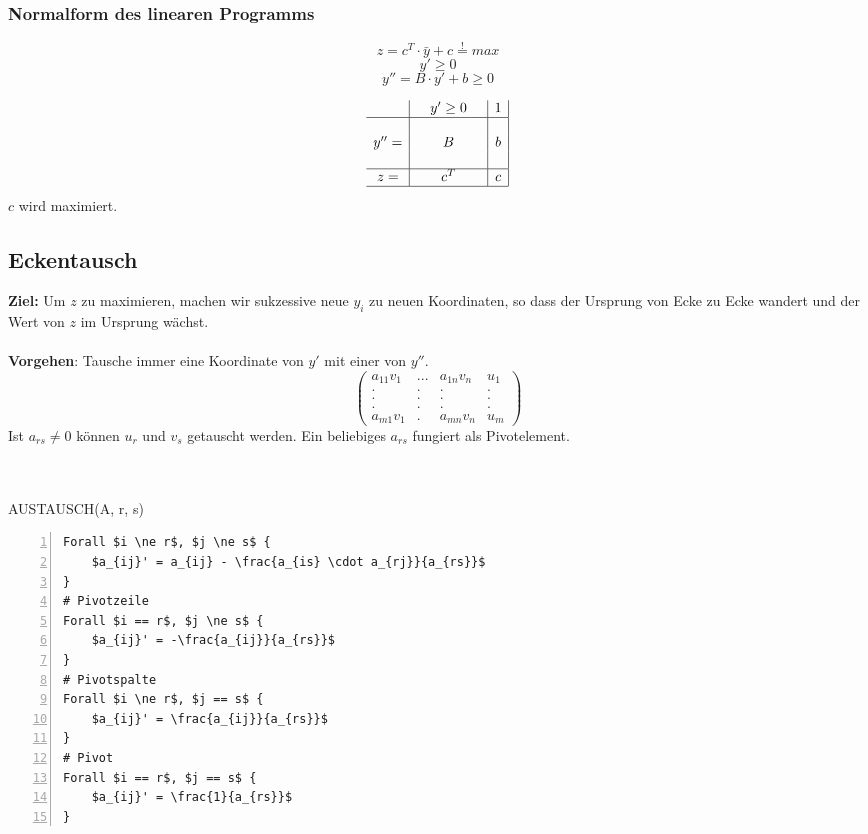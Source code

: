 \subsubsection{Normalform des linearen Programms}
\[z = c^T\cdot \bar{y} + c \stackrel{!}{=} max\]
\[y' \geq 0\]
\[y'' = B \cdot y' + b \geq 0\]

\[\begin{array}{c|ccc|c|}
	& & y' \geq 0 & & 1 \\
	\hline
	& & & & \\
	y''= & & B & & b \\
	& & & & \\
	\hline
	z= & & c^T & & c \\
	\hline
\end{array}\]
\(c\) wird maximiert.


\subsection{Eckentausch}
\textbf{Ziel:} Um \(z\) zu maximieren, machen wir sukzessive neue \(y_i\) zu neuen Koordinaten, so dass der Ursprung von Ecke zu Ecke wandert und der Wert von \(z\) im Ursprung wächst.
\\\\
\textbf{Vorgehen}: Tausche immer eine Koordinate von \(y'\) mit einer von \(y''\).
\[\begin{pmatrix}
	a_{11}v_1 & ... &a_{1n}v_n & u_1\\
	.   &		.	& .   & . \\
	.   &		.	& .   & . \\
	.   &		.	& .   & . \\
	a_{m1}v_1 & . & a_{mn}v_n & u_m
\end{pmatrix}\]
Ist \(a_{rs} \ne 0\) können \(u_r\) und \(v_s\) getauscht werden. Ein beliebiges \(a_{rs}\) fungiert als Pivotelement. 
\\\\\\
\begin{minipage}{\textwidth}
AUSTAUSCH(A, r, s)
\begin{lstlisting}[frame=single,numbers=left,mathescape]
Forall $i \ne r$, $j \ne s$ {
	$a_{ij}' = a_{ij} - \frac{a_{is} \cdot a_{rj}}{a_{rs}}$
}
# Pivotzeile
Forall $i == r$, $j \ne s$ {
	$a_{ij}' = -\frac{a_{ij}}{a_{rs}}$
}
# Pivotspalte
Forall $i \ne r$, $j == s$ {
	$a_{ij}' = \frac{a_{ij}}{a_{rs}}$
}
# Pivot
Forall $i == r$, $j == s$ {
	$a_{ij}' = \frac{1}{a_{rs}}$
}
\end{lstlisting}
\end{minipage}


